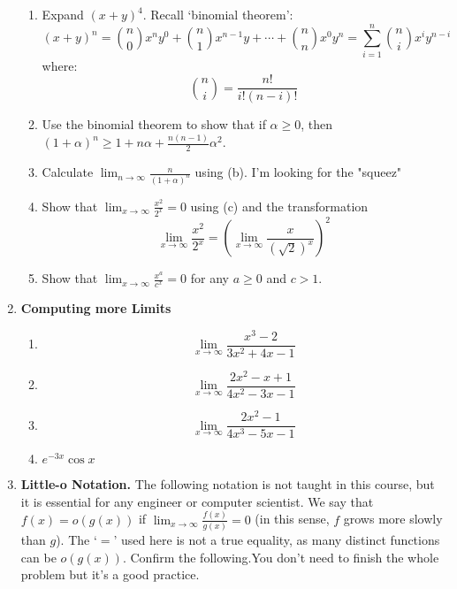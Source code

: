 \documentclass[12pt]{article}
\newcommand{\D}{\displaystyle}
\begin{document}
\begin{enumerate}
\begin{enumerate}







\item Expand $(x+y)^4$. Recall `binomial theorem':
	$$(x+y)^n=\binom{n}{0}x^ny^0+\binom{n}{1}x^{n-1}y +\cdots+\binom{n}{n}x^0y^n=\sum_{i=1}^n\binom{n}{i}x^iy^{n-i}$$
	where:
	$$\binom{n}{i}=\frac{n!}{i!(n-i)!}$$
\vskip 3cm

\vfill

\item Use the binomial theorem to show that if $\alpha\geq 0$, then $(1+\alpha)^n \geq 1 + n \alpha + \frac{n(n-1)}{2} \alpha^2$.
\vskip 4cm


\vfill

\item Calculate $\D\lim_{n\to\infty} \frac{n}{(1+\alpha)^n}$ using (b). I'm looking for the "squeez"
\vskip 3cm
\vfill

\vfill

\item Show that $\D\lim_{x\to\infty} \frac{x^2}{2^x} = 0$ using (c) and the transformation
\[ \lim_{x\to\infty} \frac{x^2}{2^x} = \left( \lim_{x\to\infty} \frac{x}{(\sqrt{2})^x} \right)^2 \]

\newpage

\item Show that $\D\lim_{x\to\infty} \frac{x^a}{c^x} = 0$ for any $a\geq 0$ and $c>1$.

\vfill

\vfill

\end{enumerate}

\item \textbf{Computing more Limits}
\begin{enumerate}
	\item $$\lim_{x \to \infty}\frac{x^3-2}{3x^2+4x-1}$$
	\vskip 3cm
	\item $$\lim_{x\to \infty}\frac{2x^2-x+1}{4x^2-3x-1}$$
	\vskip 3cm
	\item $$\lim_{x \to \infty}\frac{2x^2-1}{4x^3-5x-1}$$
	\vskip 3cm 
	\item $e^{-3x}\cos x$
	\vskip 3cm
\end{enumerate}

\item \textbf{Little-o Notation.} The following notation is not taught in this course, but it is essential for any engineer or computer scientist. We say that $f(x) = o(g(x))$ if $\D\lim_{x\to\infty} \frac{f(x)}{g(x)} = 0$ (in this sense, $f$ grows more slowly than $g$). The `$=$' used here is not a true equality, as many distinct functions can be $o(g(x))$. Confirm the following.You don't need to finish the whole problem but it's a good practice. 


\end{enumerate}
\end{document}
